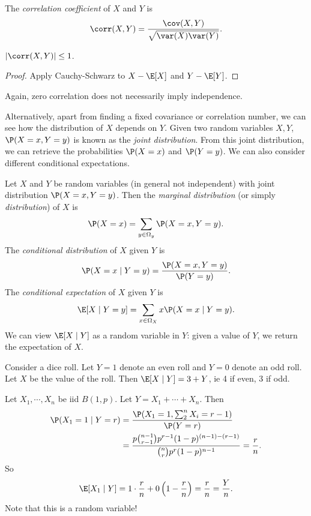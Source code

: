 \documentclass[a4paper]{article}
\begin{document}
\begin{defi}
  The \emph{correlation coefficient} of $X$ and $Y$ is
  \[
    \corr(X, Y) = \frac{\cov (X, Y)}{\sqrt{\var (X)\var (Y)}}.
  \]
\end{defi}

\begin{prop}
  $|\corr(X, Y)| \leq 1$.
\end{prop}

\begin{proof}
  Apply Cauchy-Schwarz to $X - \E[X]$ and $Y - \E[Y]$.
\end{proof}

Again, zero correlation does not necessarily imply independence.

Alternatively, apart from finding a fixed covariance or correlation number, we can see how the distribution of $X$ depends on $Y$. Given two random variables $X, Y$, $\P(X = x, Y = y)$ is known as the \emph{joint distribution}. From this joint distribution, we can retrieve the probabilities $\P(X = x)$ and $\P(Y = y)$. We can also consider different conditional expectations.

\begin{defi}
  Let $X$ and $Y$ be random variables (in general not independent) with joint distribution $\P(X = x, Y = y)$. Then the \emph{marginal distribution} (or simply \emph{distribution}) of $X$ is
  \[
    \P(X = x) = \sum_{y\in \Omega_y}\P(X = x, Y = y).
  \]
  The \emph{conditional distribution} of $X$ given $Y$ is
  \[
    \P(X = x\mid Y = y) = \frac{\P(X = x, Y = y)}{\P(Y = y)}.
  \]
  The \emph{conditional expectation} of $X$ given $Y$ is
  \[
    \E[X\mid Y = y] = \sum_{x\in \Omega_X}x\P(X = x\mid Y = y).
  \]
  We can view $\E[X\mid Y]$ as a random variable in $Y$: given a value of $Y$, we return the expectation of $X$.
\end{defi}

\begin{eg}
  Consider a dice roll. Let $Y = 1$ denote an even roll and $Y = 0$ denote an odd roll. Let $X$ be the value of the roll. Then $\E[X\mid Y] = 3 + Y$, ie 4 if even, 3 if odd.
\end{eg}

\begin{eg}
  Let $X_1, \cdots, X_n$ be iid $B(1, p)$. Let $Y = X_1 + \cdots + X_n$. Then
  \begin{align*}
    \P(X_1 = 1\mid Y = r) &= \frac{\P(X_1 = 1, \sum_{2}^n X_i = r - 1)}{\P(Y = r)}\\
    &= \frac{p\binom{n - 1}{r - 1}p^{r - 1}(1 - p)^{(n - 1) - (r - 1)}}{\binom{n}{r} p^r (1 - p)^{n - 1}} = \frac{r}{n}.
  \end{align*}
  So
  \[
    \E[X_1\mid Y] = 1 \cdot \frac{r}{n} + 0\left(1 - \frac{r}{n}\right) = \frac{r}{n} = \frac{Y}{n}.
  \]
  Note that this is a random variable!
\end{eg}
\end{document}
